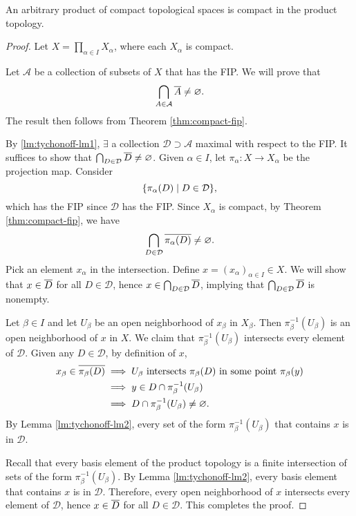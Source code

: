 \begin{thm}[Tychonoff]
    An arbitrary product of compact topological spaces is compact in the product topology.
    \begin{proof}
        Let $X = \prod_{\alpha \in I} X_\alpha$, where each $X_\alpha$ is compact. 

        Let $\mathcal A$ be a collection of subsets of $X$ that has the FIP. We will prove that
        \[
        \bigcap_{A\in \mathcal A} \Bar A \neq \emptyset.
        \]
        The result then follows from Theorem \ref{thm:compact-fip}. 

        By \ref{lm:tychonoff-lm1}, $\exists$ a collection $\mathcal D \supset \mathcal A$ maximal with respect to the FIP. It suffices to show that $\bigcap_{D\in \mathcal D} \Bar D \neq \emptyset$. Given $\alpha \in I$, let $\pi_\alpha: X \to X_\alpha$ be the projection map. Consider
        \[
        \set{\pi_\alpha(D) \mid D \in \mathcal D},
        \]
        which has the FIP since $\mathcal D$ has the FIP. Since $X_\alpha$ is compact, by Theorem \ref{thm:compact-fip}, we have
        \[
        \bigcap_{D\in \mathcal D} \Bar{\pi_\alpha(D)} \neq \emptyset.
        \]
        Pick an element $x_\alpha$ in the intersection. Define $x = (x_\alpha)_{\alpha \in I} \in X$. We will show that $x \in \Bar D$ for all $D \in \mathcal D$, hence $x \in \bigcap_{D\in \mathcal D} \Bar D$, implying that $\bigcap_{D\in \mathcal D} \Bar D$ is nonempty. 
        
        Let $\beta \in I$ and let $U_\beta$ be an open neighborhood of $x_\beta$ in $X_\beta$. Then $\pi_\beta^{-1}(U_\beta)$ is an open neighborhood of $x$ in $X$. We claim that $\pi_\beta^{-1}(U_\beta)$ intersects every element of $\mathcal D$. Given any $D \in \mathcal D$, by definition of $x$, 
        \begin{align*}
            x_\beta \in \Bar{\pi_\beta(D)} &\implies U_\beta \text{ intersects } \pi_\beta(D) \text{ in some point } \pi_\beta(y) \\
            &\implies y \in D \cap \pi_\beta^{-1}(U_\beta) \\
            &\implies D \cap \pi_\beta^{-1}(U_\beta) \neq \emptyset.
        \end{align*}
        By Lemma \ref{lm:tychonoff-lm2}, every set of the form $\pi_\beta^{-1}(U_\beta)$ that contains $x$ is in $\mathcal D$. 

        Recall that every basis element of the product topology is a finite intersection of sets of the form $\pi_\beta^{-1}(U_\beta)$. By Lemma \ref{lm:tychonoff-lm2}, every basis element that contains $x$ is in $\mathcal D$. Therefore, every open neighborhood of $x$ intersects every element of $\mathcal D$, hence $x \in \Bar D$ for all $D \in \mathcal D$. This completes the proof.
    \end{proof}
\end{thm}



